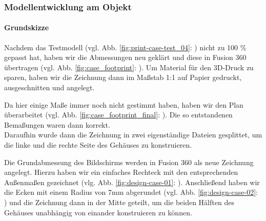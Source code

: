 \subsubsection{Modellentwicklung am Objekt}\label{hw_case_modellentwicklung}
\paragraph{Grundskizze}
\noindent Nachdem das Testmodell (vgl. Abb. \ref{fig:print-case-test_04}: ) nicht zu 100 \% gepasst hat, haben wir die Abmessungen neu geklärt und diese in Fusion 360 übertragen (vgl. Abb. \ref{fig:case_footprint}: ). 
Um Material für den 3D-Druck zu sparen, haben wir die Zeichnung dann im Maßstab 1:1 auf Papier gedruckt, ausgeschnitten und angelegt.\par
\noindent Da hier einige Maße immer noch nicht gestimmt haben, haben wir den Plan überarbeitet (vgl. Abb. \ref{fig:case_footprint_final}: ). 
Die so entstandenen Bemaßungen waren dann korrekt.\\
\noindent Daraufhin wurde dann die Zeichnung in zwei eigenständige Dateien gesplittet, um die linke und die rechte Seite des Gehäuses zu konstruieren.\par
\noindent Die Grundabmessung des Bildschirms werden in Fusion 360 als neue Zeichnung angelegt. 
Hierzu haben wir ein einfaches Rechteck mit den entsprechenden Außenmaßen gezeichnet (vlg. Abb. \ref{fig:design-case-01}: ). 
Anschließend haben wir die Ecken mit einem Radius von 7mm abgerundet (vgl. Abb. \ref{fig:design-case-02}: ) und die Zeichnung dann in der Mitte geteilt, um die beiden Hälften des Gehäuses unabhängig von einander konstruieren zu können.\par
